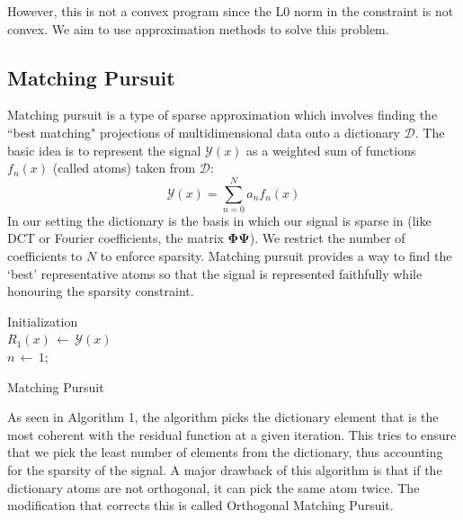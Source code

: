\documentclass[letterpaper, 10 pt, conference]{article}
\begin{document}
However, this is not a convex program since the L0 norm in the constraint is not convex. We aim to use approximation methods to solve this problem.

\subsection{Matching Pursuit}
Matching pursuit \cite{wiki_mp} is a type of sparse approximation which involves finding the ``best matching" projections of multidimensional data onto a dictionary $\mathcal{D}$. The basic idea is to represent the signal $\mathcal{Y}(x)$ as a weighted sum of functions $f_{n}(x)$ (called atoms) taken from $\mathcal{D}$:
$$\mathcal{Y}(x) = \sum_{n=0}^{N} a_n f_{n}(x)$$
In our setting the dictionary is the basis in which our signal is sparse in (like DCT or Fourier coefficients, the matrix $\mathbf{\Phi \Psi}$). We restrict the number of coefficients to $N$ to enforce sparsity. Matching pursuit provides a way to find the `best' representative atoms so that the signal is represented faithfully while honouring the sparsity constraint.

\begin{algorithm}[]
 Initialization\: \\
 $R_1(x)\,\leftarrow\,\mathcal{Y}(x)$ \\
 $n\,\leftarrow\,1;$\\
 \caption{Matching Pursuit}
\end{algorithm}

As seen in Algorithm 1, the algorithm picks the dictionary element that is the most coherent with the residual function at a given iteration. This tries to ensure that we pick the least number of elements from the dictionary, thus accounting for the sparsity of the signal. A major drawback of this algorithm is that if the dictionary atoms are not orthogonal, it can pick the same atom twice. The modification that corrects this is called Orthogonal Matching Pursuit.
\end{document}
